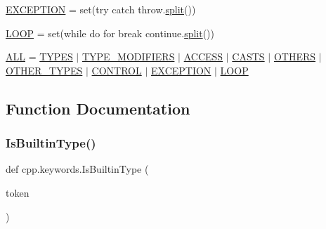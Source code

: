 \begin{DoxyCompactItemize}
\item 
\mbox{\hyperlink{namespacecpp_1_1keywords_a2665fb8a25a4dae03fa5d3dc975c537c}{E\+X\+C\+E\+P\+T\+I\+ON}} = set(\textquotesingle{}try catch throw\textquotesingle{}.\mbox{\hyperlink{_input_8h_aec2fd8cd9140a1b535dc54a924396f40}{split}}())
\item 
\mbox{\hyperlink{namespacecpp_1_1keywords_af0164c05398a2291487b76414102d555}{L\+O\+OP}} = set(\textquotesingle{}while do for break continue\textquotesingle{}.\mbox{\hyperlink{_input_8h_aec2fd8cd9140a1b535dc54a924396f40}{split}}())
\item 
\mbox{\hyperlink{namespacecpp_1_1keywords_a2e8727b78fb9434c99ac8518c6dd1ecc}{A\+LL}} = \mbox{\hyperlink{namespacecpp_1_1keywords_a56fd5baf357970548e1ec366edfc2c13}{T\+Y\+P\+ES}} $\vert$ \mbox{\hyperlink{namespacecpp_1_1keywords_af9282ce418d6b4b43dca5ed574caedd7}{T\+Y\+P\+E\+\_\+\+M\+O\+D\+I\+F\+I\+E\+RS}} $\vert$ \mbox{\hyperlink{namespacecpp_1_1keywords_a786f41bbea982641425c819d10bb2064}{A\+C\+C\+E\+SS}} $\vert$ \mbox{\hyperlink{namespacecpp_1_1keywords_aeba38dc38e188040f4ec44ba05092e7f}{C\+A\+S\+TS}} $\vert$ \mbox{\hyperlink{namespacecpp_1_1keywords_a15fe231fbad145538b73892804898809}{O\+T\+H\+E\+RS}} $\vert$ \mbox{\hyperlink{namespacecpp_1_1keywords_aa86a5e35a3ace14022a5ca1b91baf207}{O\+T\+H\+E\+R\+\_\+\+T\+Y\+P\+ES}} $\vert$ \mbox{\hyperlink{namespacecpp_1_1keywords_a374dfe9c96681079802ba4724287b8ff}{C\+O\+N\+T\+R\+OL}} $\vert$ \mbox{\hyperlink{namespacecpp_1_1keywords_a2665fb8a25a4dae03fa5d3dc975c537c}{E\+X\+C\+E\+P\+T\+I\+ON}} $\vert$ \mbox{\hyperlink{namespacecpp_1_1keywords_af0164c05398a2291487b76414102d555}{L\+O\+OP}}
\end{DoxyCompactItemize}


\subsection{Function Documentation}
\mbox{\label{namespacecpp_1_1keywords_ae0f7a581fef26ad1a71c59bd963ee285}} 
\subsubsection{\texorpdfstring{IsBuiltinType()}{IsBuiltinType()}}
{\footnotesize\ttfamily def cpp.\+keywords.\+Is\+Builtin\+Type (\begin{DoxyParamCaption}\item[{}]{token }\end{DoxyParamCaption})}

